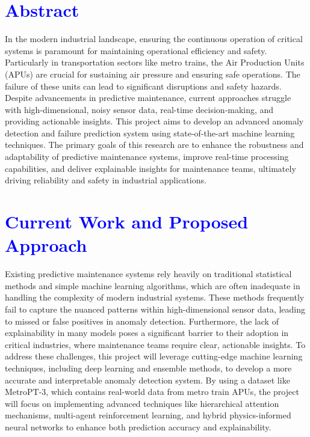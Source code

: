 \documentclass[11pt,a4paper]{article}
\begin{document}
\section*{\textcolor{blue}{Abstract}}

In the modern industrial landscape, ensuring the continuous operation of critical systems is paramount for maintaining operational efficiency and safety. Particularly in transportation sectors like metro trains, the Air Production Units (APUs) are crucial for sustaining air pressure and ensuring safe operations. The failure of these units can lead to significant disruptions and safety hazards. Despite advancements in predictive maintenance, current approaches struggle with high-dimensional, noisy sensor data, real-time decision-making, and providing actionable insights. This project aims to develop an advanced anomaly detection and failure prediction system using state-of-the-art machine learning techniques. The primary goals of this research are to enhance the robustness and adaptability of predictive maintenance systems, improve real-time processing capabilities, and deliver explainable insights for maintenance teams, ultimately driving reliability and safety in industrial applications.

\section*{\textcolor{blue}{Current Work and Proposed Approach}}

Existing predictive maintenance systems rely heavily on traditional statistical methods and simple machine learning algorithms, which are often inadequate in handling the complexity of modern industrial systems. These methods frequently fail to capture the nuanced patterns within high-dimensional sensor data, leading to missed or false positives in anomaly detection. Furthermore, the lack of explainability in many models poses a significant barrier to their adoption in critical industries, where maintenance teams require clear, actionable insights. To address these challenges, this project will leverage cutting-edge machine learning techniques, including deep learning and ensemble methods, to develop a more accurate and interpretable anomaly detection system. By using a dataset like MetroPT-3, which contains real-world data from metro train APUs, the project will focus on implementing advanced techniques like hierarchical attention mechanisms, multi-agent reinforcement learning, and hybrid physics-informed neural networks to enhance both prediction accuracy and explainability.
\end{document}
